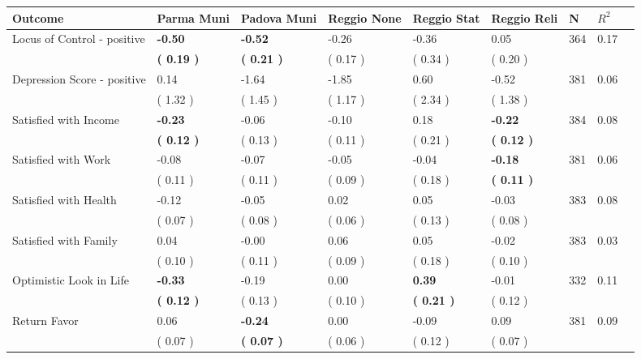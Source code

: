 \begin{tabular}{L{6.2cm} C{1.8cm} C{1.8cm} C{1.8cm} C{1.8cm} C{1.8cm} C{1.8cm} C{0.3cm} C{0.3cm}}
\toprule
 \textbf{Outcome} & \textbf{Parma Muni} & \textbf{Padova Muni} & \textbf{Reggio None} & \textbf{Reggio Stat} & \textbf{Reggio Reli} & \textbf{N} & \textbf{$ R^2$} \\
\midrule
Locus of Control - positive & \textbf{    -0.50} & \textbf{    -0.52} &     -0.26 &     -0.36 &      0.05  & 364 &       0.17 \\ 
 & \textbf{(     0.19 )} & \textbf{(     0.21 )} & (     0.17 ) & (     0.34 ) & (     0.20 )  & \\
Depression Score - positive &      0.14 &     -1.64 &     -1.85 &      0.60 &     -0.52  & 381 &       0.06 \\ 
 & (     1.32 ) & (     1.45 ) & (     1.17 ) & (     2.34 ) & (     1.38 )  & \\
Satisfied with Income & \textbf{    -0.23} &     -0.06 &     -0.10 &      0.18 & \textbf{    -0.22}  & 384 &       0.08 \\ 
 & \textbf{(     0.12 )} & (     0.13 ) & (     0.11 ) & (     0.21 ) & \textbf{(     0.12 )}  & \\
Satisfied with Work &     -0.08 &     -0.07 &     -0.05 &     -0.04 & \textbf{    -0.18}  & 381 &       0.06 \\ 
 & (     0.11 ) & (     0.11 ) & (     0.09 ) & (     0.18 ) & \textbf{(     0.11 )}  & \\
Satisfied with Health &     -0.12 &     -0.05 &      0.02 &      0.05 &     -0.03  & 383 &       0.08 \\ 
 & (     0.07 ) & (     0.08 ) & (     0.06 ) & (     0.13 ) & (     0.08 )  & \\
Satisfied with Family &      0.04 &     -0.00 &      0.06 &      0.05 &     -0.02  & 383 &       0.03 \\ 
 & (     0.10 ) & (     0.11 ) & (     0.09 ) & (     0.18 ) & (     0.10 )  & \\
Optimistic Look in Life & \textbf{    -0.33} &     -0.19 &      0.00 & \textbf{     0.39} &     -0.01  & 332 &       0.11 \\ 
 & \textbf{(     0.12 )} & (     0.13 ) & (     0.10 ) & \textbf{(     0.21 )} & (     0.12 )  & \\
Return Favor &      0.06 & \textbf{    -0.24} &      0.00 &     -0.09 &      0.09  & 381 &       0.09 \\ 
 & (     0.07 ) & \textbf{(     0.07 )} & (     0.06 ) & (     0.12 ) & (     0.07 )  & \\

\end{tabular}
